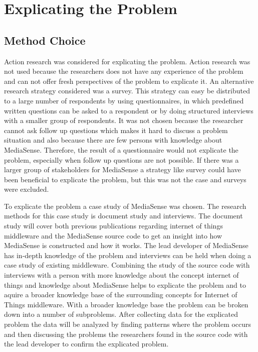 \section{Explicating the Problem}
\subsection{Method Choice}
Action research was considered for explicating the problem. Action research was not used because the researchers does not have any experience of the problem and can not offer fresh perspectives of the problem to explicate it. An alternative research strategy considered was a survey. This strategy can easy be distributed to a large number of respondents by using questionnaires, in which predefined written questions can be asked to a respondent or by doing structured interviews with a smaller group of respondents. It was not chosen because the researcher cannot ask follow up questions which makes it hard to discuss a problem situation and also because there are few persons with knowledge about MediaSense. Therefore, the result of a questionnaire would not explicate the problem, especially when follow up questions are not possible. If there was a larger group of stakeholders for MediaSense a strategy like survey could have been beneficial to explicate the problem, but this was not the case and surveys were excluded.

To explicate the problem a case study of MediaSense was chosen. The research methods for this case study is document study and interviews. The document study will cover both previous publications regarding internet of things middleware and the MediaSense source code to get an insight into how MediaSense is constructed and how it works. The lead developer of MediaSense has in-depth knowledge of the problem and interviews can be held when doing a case study of existing middleware. Combining the study of the source code with interviews with a person with more knowledge about the concept internet of things and knowledge about MediaSense helps to explicate the problem and to aquire a broader knowledge base of the surrounding concepts for Internet of Things middleware. With a broader knowledge base the problem can be broken down into a number of subproblems. After collecting data for the explicated problem the data will be analyzed by finding patterns where the problem occurs and then discussing the problems the researchers found in the source code with the lead developer to confirm the explicated problem. 

